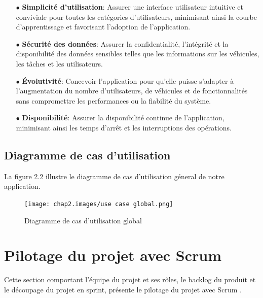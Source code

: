 \begin{itemize}
  \item[$\bullet$] \textbf {Simplicité d'utilisation}:  Assurer une interface utilisateur intuitive et conviviale pour toutes les catégories d'utilisateurs, minimisant ainsi la courbe d'apprentissage et favorisant l'adoption de l'application.\\

  \item[$\bullet$] \textbf {Sécurité des données}: Assurer la confidentialité, l'intégrité et la disponibilité des données sensibles telles que les informations sur les véhicules, les tâches et les utilisateurs.\\

  \item[$\bullet$] \textbf {Évolutivité}: Concevoir l'application pour qu'elle puisse s'adapter à l'augmentation du nombre d'utilisateurs, de véhicules et de fonctionnalités sans compromettre les performances ou la fiabilité du système.\\

  \item[$\bullet$] \textbf {Disponibilité}:  Assurer la disponibilité continue de l'application, minimisant ainsi les temps d'arrêt et les interruptions des opérations.


\end{itemize}




\newpage
\subsection{Diagramme de cas d'utilisation}
La figure 2.2 illustre le diagramme de cas d'utilisation géneral de notre application.
\begin{figure}[ht]
  \centering
  \texttt{[image: chap2.images/use case global.png]}
  \caption{Diagramme de cas d'utilisation global}
\end{figure}






\newpage
\section{Pilotage du projet avec Scrum}
Cette section comportant l’équipe du projet et ses rôles, le backlog du produit et le découpage du projet en sprint, présente le pilotage du projet avec Scrum .
